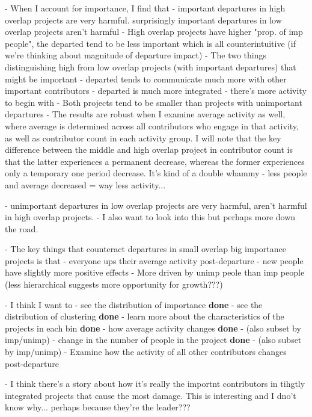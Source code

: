 - When I account for importance, I find that
  - important departures in high overlap projects are very harmful. surprisingly important departures in low overlap projects aren't harmful
    - High overlap projects have higher "prop. of imp people", the departed tend to be less important which is all counterintuitive (if we're thinking about magnitude of departure impact)
    - The two things distinguishing high from low overlap projects (with important departures) that might be important
      - departed tends to communicate much more with other important contributors
      - departed is much more integrated 
      - there's more activity to begin with 
    - Both projects tend to be smaller than projects with unimportant departures
  - The results are robust when I examine average activity as well, where average is determined across all contributors who engage in that activity, as well as contributor count in each activity group. I will note that the key difference between the middle and high overlap project in contributor count is that the latter experiences a permanent decrease, whereas the former experiences only a temporary one period decrease. It's kind of a double whammy - less people and average decreased = way less activity... 
    
  - unimportant departures in low overlap projects are very harmful, aren't harmful in high overlap projects. 
    - I also want to look into this but perhaps more down the road. 

  - The key things that counteract departures in small overlap big importance projects is that
    - everyone ups their average activity post-departure
    - new people have slightly more positive effects
    - More driven by unimp peole than imp people (less hierarchical suggests more opportunity for growth???) 


  - I think I want to 
    - see the distribution of importance \textbf{done}
    - see the distribution of clustering \textbf{done}
    - learn more about the characteristics of the projects in each bin \textbf{done}
    - how average activity changes \textbf{done}
      - (also subset by imp/unimp)
    - change in the number of people in the project \textbf{done}
      - (also subset by imp/unimp)
    - Examine how the activity of all other contributors changes post-departure
        
  - I think there's a story about how it's really the importnt contributors in tihgtly integrated projects that cause the most damage. This is interesting and I dno't know why... perhaps because they're the leader??? 



